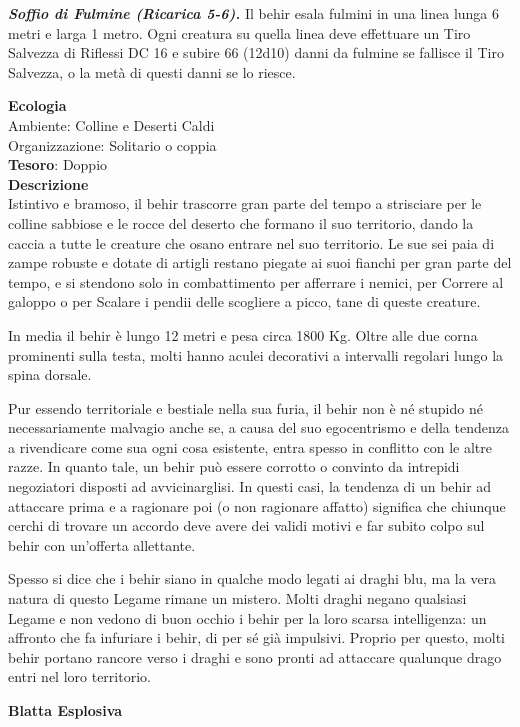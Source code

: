 \begin{multicols}{2}
	\textit{\textbf{Soffio di Fulmine (Ricarica 5-6).}} Il behir esala fulmini in una linea lunga 6 metri e larga 1 metro. Ogni creatura su quella linea deve effettuare un Tiro Salvezza di Riflessi DC 16 e subire 66 (12d10) danni da fulmine se fallisce il Tiro Salvezza, o la metà di questi danni se lo riesce.

	\textbf{Ecologia}\\
	Ambiente: Colline e Deserti Caldi\\
	Organizzazione: Solitario o coppia\\
	\textbf{Tesoro}: Doppio\\
	\textbf{Descrizione}\\
	Istintivo e bramoso, il behir trascorre gran parte del tempo a strisciare per le colline sabbiose e le rocce del deserto che formano il suo territorio, dando la caccia a tutte le creature che osano entrare nel suo territorio. Le sue sei paia di zampe robuste e dotate di artigli restano piegate ai suoi fianchi per gran parte del tempo, e si stendono solo in combattimento per afferrare i nemici, per Correre al galoppo o per Scalare i pendii delle scogliere a picco, tane di queste creature.

	In media il behir è lungo 12 metri e pesa circa 1800 Kg. Oltre alle due corna prominenti sulla testa, molti hanno aculei decorativi a intervalli regolari lungo la spina dorsale.

	Pur essendo territoriale e bestiale nella sua furia, il behir non è né stupido né necessariamente malvagio anche se, a causa del suo egocentrismo e della tendenza a rivendicare come sua ogni cosa esistente, entra spesso in conflitto con le altre razze. In quanto tale, un behir può essere corrotto o convinto da intrepidi negoziatori disposti ad avvicinarglisi. In questi casi, la tendenza di un behir ad attaccare prima e a ragionare poi (o non ragionare affatto) significa che chiunque cerchi di trovare un accordo deve avere dei validi motivi e far subito colpo sul behir con un'offerta allettante.

	Spesso si dice che i behir siano in qualche modo legati ai draghi blu, ma la vera natura di questo Legame rimane un mistero. Molti draghi negano qualsiasi Legame e non vedono di buon occhio i behir per la loro scarsa intelligenza: un affronto che fa infuriare i behir, di per sé già impulsivi. Proprio per questo, molti behir portano rancore verso i draghi e sono pronti ad attaccare qualunque drago entri nel loro territorio.

	\medskip{}\textbf{Blatta Esplosiva}


\end{multicols}

